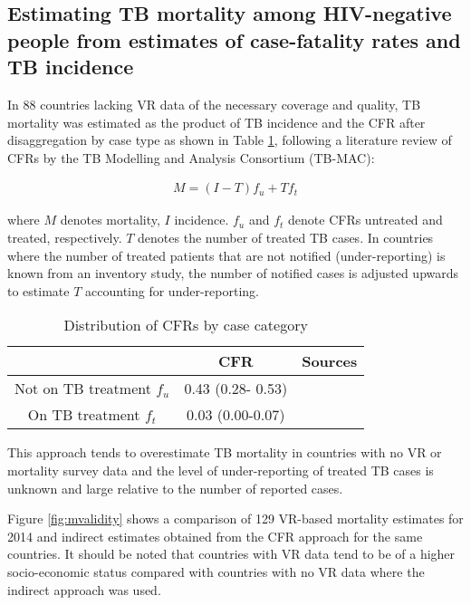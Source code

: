 \subsection{Estimating TB mortality among HIV-negative people from estimates of case-fatality rates and TB incidence
}

In 88 countries lacking VR data of the necessary coverage and quality, TB mortality was estimated as the product of TB incidence and the CFR after disaggregation by case type as shown in Table \ref{tab:cfr}, following a literature review of CFRs by the TB Modelling and Analysis Consortium (TB-MAC):

\begin{align*}
M = (I-T)f_u + Tf_t 
\end{align*}

where $M$ denotes mortality, $I$ incidence. $f_u$ and $f_t$ denote CFRs untreated and treated, respectively. $T$ denotes the number of treated TB cases. In countries where the number of treated patients that are not notified (under-reporting) is known from an inventory study, the number of notified cases is adjusted upwards to estimate $T$ accounting for under-reporting. 

\begin{table} 
    \begin{tabular}{ c c c }
    \hline
         & CFR & Sources \\ 
         \hline
        Not on TB treatment $f_u$ & 0.43 (0.28- 0.53) &  \cite{12742798} \cite{21483732} \\ 
        On TB treatment $f_t$ & 0.03 (0.00-0.07) &  \cite{21738585} \\ 
        \hline
    \end{tabular} 
    \caption{Distribution of CFRs by case category} 
    \label{tab:cfr}
\end{table}

This approach tends to overestimate TB mortality in countries with no VR or mortality survey data and the level of under-reporting of treated TB cases is unknown and large relative to the number of reported cases. 

Figure \ref{fig:mvalidity} shows a comparison of 129 VR-based mortality estimates for 2014 and indirect estimates obtained from the CFR approach for the same countries. It should be noted that countries with VR data tend to be of a higher socio-economic status compared with countries with no VR data where the indirect approach was used.


